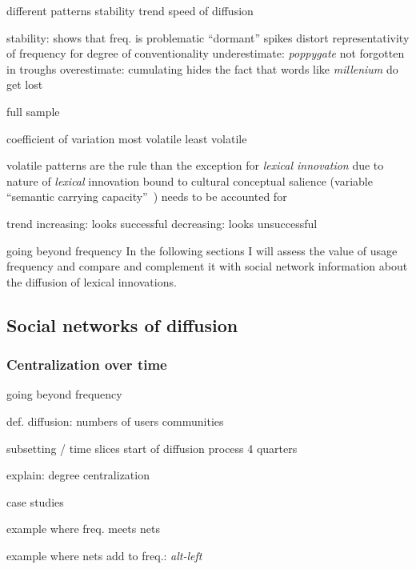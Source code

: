 \documentclass[
  a4paper,
  abstract=on,
  captions=tableabove
  ]{scrartcl}
\begin{document}
\begin{figure}
\begin{subfigure}{.3\linewidth}
    \end{subfigure}
  \end{figure}

  different patterns
  stability
  trend
  speed of diffusion

  stability: shows that freq. is problematic
  \enquote{dormant}
  spikes distort representativity of frequency for degree of conventionality
  underestimate: \emph{poppygate} not forgotten in troughs
  overestimate: cumulating hides the fact that words like \emph{millenium} do get lost


  full sample

  coefficient of variation
  most volatile
  least volatile

  volatile patterns are the rule than the exception for \emph{lexical innovation}
  due to nature of \emph{lexical} innovation
  bound to cultural conceptual salience (variable \enquote{semantic carrying capacity}~\parencite{Nini2017ApplicationGrowth})
  needs to be accounted for

  trend
  increasing: looks successful
  decreasing: looks unsuccessful

  going beyond frequency
  In the following sections I will assess the value of usage frequency and compare and complement it with social network information about the diffusion of lexical innovations.

  \subsection{Social networks of diffusion}
    \label{subsec:sna}

    \subsubsection{Centralization over time}

  going beyond frequency

  def. diffusion:
  numbers of users
  communities

  subsetting / time slices
  start of diffusion process
  4 quarters

  explain: degree centralization

  case studies

  example where freq. meets nets

  example where nets add to freq.: \emph{alt-left}

\end{document}
